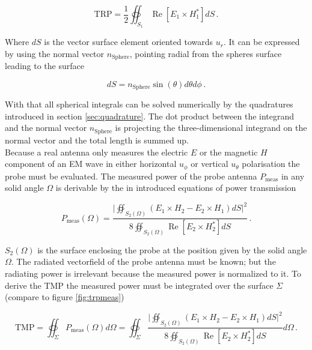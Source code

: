 \begin{equation}
\text{TRP}=\frac{1}{2}  \oiint_{S_1} \operatorname{Re}\left[E_1	\times H_1^*\right]dS\,.
\end{equation}

Where $dS$ is the vector surface element oriented towards $u_r$. It can be expressed by using the normal vector $n_\text{Sphere}$, pointing radial from the spheres surface leading to the surface 

\begin{equation}
dS = n_\text{Sphere}\sin\left(\theta\right) d\theta d\phi\,.
\end{equation}

With that all spherical integrals can be solved numerically by the quadratures introduced in section \ref{sec:quadrature}. The dot product between the integrand and the normal vector $n_\text{Sphere}$ is projecting the three-dimensional integrand on the normal vector and the total length is summed up.\\
Because a real antenna only measures the electric $E$ or the magnetic $H$ component of an \ac{EM} wave in either horizontal $u_\phi$ or vertical $u_\theta$ polarisation the probe must be evaluated. The measured power of the probe antenna $P_\text{meas}$ in any solid angle $\Omega$ is derivable by the in \cite{book} introduced equations of power transmission

\begin{equation}
P_\text{meas}\left(\Omega\right) = \frac{\big|\oiint_{S_2\left(\Omega\right)}\left(E_1\times H_2 - E_2\times H_1\right)dS\big|^2}{8\oiint_{S_2\left(\Omega\right)}\operatorname{Re}\left[E_2\times H_2^*\right]dS}\,.
\end{equation}

$S_2\left(\Omega\right)$  is the surface enclosing the probe at the position given by the solid angle $\Omega$. The radiated vectorfield of the probe antenna must be known; but the radiating power is irrelevant because the measured power is normalized to it. To derive the \ac{TMP} the measured power must be integrated over the surface $\Sigma$ (compare to figure \ref{fig:trpmeas}) \cite{mypaper}

\begin{equation}
\text{TMP}=\oiint_\Sigma P_\text{meas}\left(\Omega\right)d\Omega = \oiint_\Sigma \frac{\big|\oiint_{S_2\left(\Omega\right)}\left(E_1\times H_2 - E_2\times H_1\right)dS\big|^2}{8\oiint_{S_2\left(\Omega\right)}\operatorname{Re}\left[E_2\times H_2^*\right]dS} d\Omega\,.
\label{eq:trpint}
\end{equation}  

